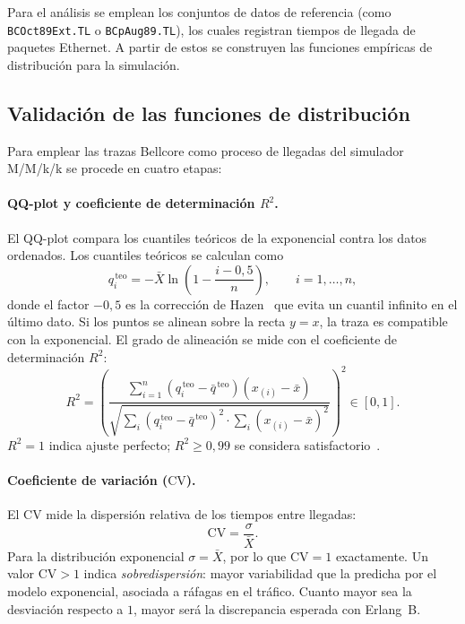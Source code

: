 \documentclass[12pt,a4paper]{article}
\theoremstyle{definition}
\theoremstyle{plain}
\theoremstyle{remark}
\begin{document}
Para el análisis se emplean los conjuntos de datos de referencia (como \texttt{BCOct89Ext.TL}
o \texttt{BCpAug89.TL}), los cuales registran tiempos de llegada de paquetes Ethernet.
A partir de estos se construyen las funciones empíricas de distribución para la simulación.

\subsection*{Validación de las funciones de distribución}

Para emplear las trazas Bellcore como proceso de llegadas del simulador M/M/k/k se
procede en cuatro etapas:

\paragraph{QQ-plot y coeficiente de determinación $R^2$.}
El QQ-plot compara los cuantiles teóricos de la exponencial contra los datos
ordenados. Los cuantiles teóricos se calculan como
\begin{equation}
    q_i^{\,\text{teo}} = -\bar{X}\ln\!\left(1-\frac{i-0{,}5}{n}\right),
    \qquad i=1,\ldots,n,
    \label{eq:qteo}
\end{equation}
donde el factor $-0{,}5$ es la corrección de Hazen~\cite{makkonen2008} que
evita un cuantil infinito en el último dato. Si los puntos se alinean sobre
la recta $y=x$, la traza es compatible con la exponencial. El grado de
alineación se mide con el coeficiente de determinación $R^2$:
\begin{equation}
    R^2 = \left(
    \frac{\sum_{i=1}^{n}
          (q_i^{\,\text{teo}}-\bar{q}^{\,\text{teo}})(x_{(i)}-\bar{x})}
         {\sqrt{\sum_{i}(q_i^{\,\text{teo}}-\bar{q}^{\,\text{teo}})^2
                \cdot\sum_{i}(x_{(i)}-\bar{x})^2}}
    \right)^{\!2} \in [0,1].
    \label{eq:R2}
\end{equation}
$R^2=1$ indica ajuste perfecto; $R^2\geq0{,}99$ se considera
satisfactorio~\cite{law2015}.

\paragraph{Coeficiente de variación ($\mathrm{CV}$).}
El CV mide la dispersión relativa de los tiempos entre llegadas:
\begin{equation}
    \mathrm{CV} = \frac{\sigma}{\bar{X}}.
    \label{eq:cv}
\end{equation}
Para la distribución exponencial $\sigma = \bar{X}$, por lo que
$\mathrm{CV}=1$ exactamente. Un valor $\mathrm{CV}>1$ indica
\emph{sobredispersión}: mayor variabilidad que la predicha por el modelo
exponencial, asociada a ráfagas en el tráfico. Cuanto mayor sea la
desviación respecto a $1$, mayor será la discrepancia esperada con
Erlang~B.
\end{document}
